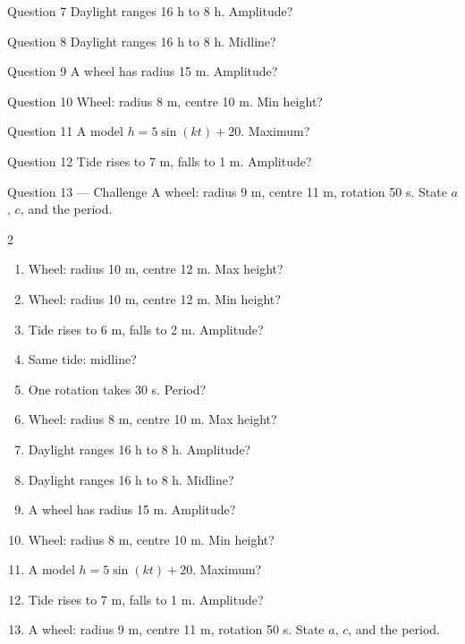 \documentclass[11pt]{article}
\begin{document}
\begin{qbox}{Question 7}
Daylight ranges 16 h to 8 h. Amplitude?\workspace{2.4cm}
\end{qbox}

\begin{qbox}{Question 8}
Daylight ranges 16 h to 8 h. Midline?\workspace{2.4cm}
\end{qbox}

\begin{qbox}{Question 9}
A wheel has radius 15 m. Amplitude?\workspace{2.4cm}
\end{qbox}

\begin{qbox}{Question 10}
Wheel: radius 8 m, centre 10 m. Min height?\workspace{2.4cm}
\end{qbox}

\begin{qbox}{Question 11}
A model $h=5\sin(kt)+20$. Maximum?\workspace{2.4cm}
\end{qbox}

\begin{qbox}{Question 12}
Tide rises to 7 m, falls to 1 m. Amplitude?\workspace{2.4cm}
\end{qbox}

\begin{qbox}{Question 13 --- Challenge}
A wheel: radius 9 m, centre 11 m, rotation 50 s. State $a$, $c$, and the period.\workspace{3cm}
\end{qbox}

\clearpage
{}

\begin{recapbox}
\begin{multicols}{2}
\small
\begin{enumerate}[leftmargin=*,itemsep=3pt]
  \item Wheel: radius 10 m, centre 12 m. Max height?
  \item Wheel: radius 10 m, centre 12 m. Min height?
  \item Tide rises to 6 m, falls to 2 m. Amplitude?
  \item Same tide: midline?
  \item One rotation takes 30 s. Period?
  \item Wheel: radius 8 m, centre 10 m. Max height?
  \item Daylight ranges 16 h to 8 h. Amplitude?
  \item Daylight ranges 16 h to 8 h. Midline?
  \item A wheel has radius 15 m. Amplitude?
  \item Wheel: radius 8 m, centre 10 m. Min height?
  \item A model $h=5\sin(kt)+20$. Maximum?
  \item Tide rises to 7 m, falls to 1 m. Amplitude?
  \item A wheel: radius 9 m, centre 11 m, rotation 50 s. State $a$, $c$, and the period.
\end{enumerate}
\end{multicols}
\end{recapbox}
\end{document}
